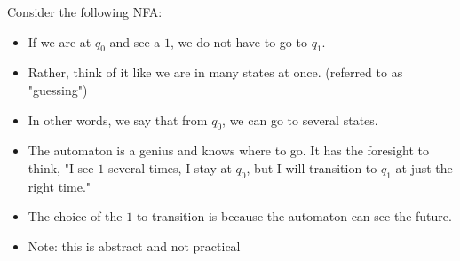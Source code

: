 \documentclass[11pt,a4paper]{article}
\begin{document}
\begin{example}
    Consider the following NFA:
    
    \begin{itemize}
        \item If we are at $q_0$ and see a $1$, we do not have to go to $q_1$.
        \item Rather, think of it like we are in many states at once. (referred to as "guessing")
        \item In other words, we say that from $q_0$, we can go to several states.
        \item The automaton is a genius and knows where to go. It has the foresight to think, "I see $1$ several times, I stay at $q_0$, but I will transition to $q_1$ at just the right time."
        \item The choice of the $1$ to transition is because the automaton can see the future.
        \item Note: this is abstract and not practical
    \end{itemize}
\end{example}
\end{document}
